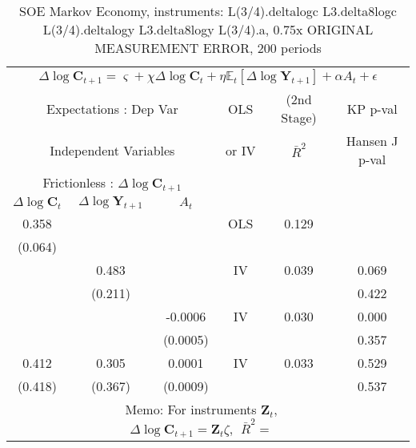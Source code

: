 \begin{table}\caption{SOE Markov Economy, instruments: L(3/4).deltalogc L3.delta8logc L(3/4).deltalogy L3.delta8logy L(3/4).a, 0.75x ORIGINAL MEASUREMENT ERROR, 200 periods}
\begin{tabular}{cccccc}
 \hline \hline\multicolumn{6}{c}{$ \Delta \log \mathbf{C}_{t+1} = \varsigma + \chi \Delta \log \mathbf{C}_t + \eta \mathbb{E}_t[\Delta \log \mathbf{Y}_{t+1}] + \alpha A_t + \epsilon $ } 
\\ \multicolumn{3}{c}{Expectations : Dep Var} & OLS &  (2nd Stage) & KP p-val 
\\ \multicolumn{3}{c}{Independent Variables} & or IV & $ \bar{R}^{2} $ & Hansen J p-val 
\\ \hline \multicolumn{3}{c}{Frictionless : $\Delta \log \mathbf{C}_{t+1}$} & & & 
\\ \multicolumn{1}{c}{$\Delta \log \mathbf{C}_{t} $} & \multicolumn{1}{c}{$\Delta \log \mathbf{Y}_{t+1}$}& \multicolumn{1}{c}{$ A_{t}  $} & & & 
\\ 0.358 & & & OLS & 0.129& 
\\ (0.064) & & & & & 
\\ & 0.483 & & IV & 0.039 & 0.069
\\ & (0.211) & & & & 0.422
\\ & & -0.0006 & IV & 0.030 & 0.000
\\ & & (0.0005) & & & 0.357
\\ 0.412 & 0.305 & 0.0001 & IV & 0.033 & 0.529
\\ (0.418) & (0.367) & (0.0009) & & & 0.537
\\ & \multicolumn{4}{c}{Memo: For instruments $\mathbf{Z}_{t}$,  $\Delta \log \mathbf{C}_{t+1} = \mathbf{Z}_{t} \zeta,~~\bar{R}^{2}=$ } 0.044 & 
\\ \hline \hline 
\end{tabular} 
\end{table} 
\newpage 

